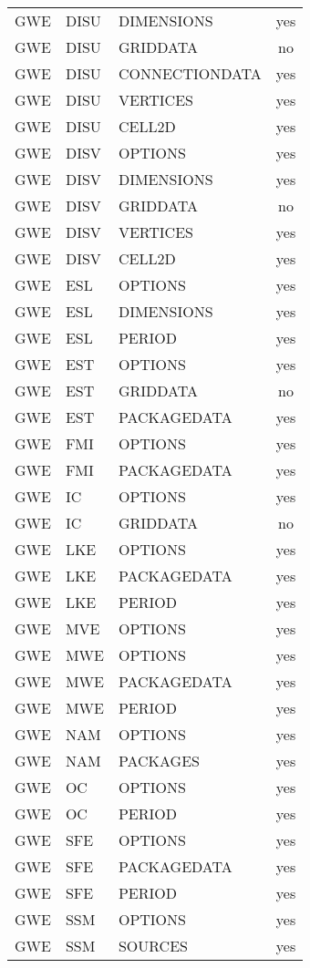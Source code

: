 \begin{longtable}{p{1.5cm} p{1.5cm} p{3cm} c}
GWE & DISU & DIMENSIONS & yes \\ 
GWE & DISU & GRIDDATA & no \\ 
GWE & DISU & CONNECTIONDATA & yes \\ 
GWE & DISU & VERTICES & yes \\ 
GWE & DISU & CELL2D & yes \\ 
\hline
GWE & DISV & OPTIONS & yes \\ 
GWE & DISV & DIMENSIONS & yes \\ 
GWE & DISV & GRIDDATA & no \\ 
GWE & DISV & VERTICES & yes \\ 
GWE & DISV & CELL2D & yes \\ 
\hline
GWE & ESL & OPTIONS & yes \\ 
GWE & ESL & DIMENSIONS & yes \\ 
GWE & ESL & PERIOD & yes \\ 
\hline
GWE & EST & OPTIONS & yes \\ 
GWE & EST & GRIDDATA & no \\ 
GWE & EST & PACKAGEDATA & yes \\ 
\hline
GWE & FMI & OPTIONS & yes \\ 
GWE & FMI & PACKAGEDATA & yes \\ 
\hline
GWE & IC & OPTIONS & yes \\ 
GWE & IC & GRIDDATA & no \\ 
\hline
GWE & LKE & OPTIONS & yes \\ 
GWE & LKE & PACKAGEDATA & yes \\ 
GWE & LKE & PERIOD & yes \\ 
\hline
GWE & MVE & OPTIONS & yes \\ 
\hline
GWE & MWE & OPTIONS & yes \\ 
GWE & MWE & PACKAGEDATA & yes \\ 
GWE & MWE & PERIOD & yes \\ 
\hline
GWE & NAM & OPTIONS & yes \\ 
GWE & NAM & PACKAGES & yes \\ 
\hline
GWE & OC & OPTIONS & yes \\ 
GWE & OC & PERIOD & yes \\ 
\hline
GWE & SFE & OPTIONS & yes \\ 
GWE & SFE & PACKAGEDATA & yes \\ 
GWE & SFE & PERIOD & yes \\ 
\hline
GWE & SSM & OPTIONS & yes \\ 
GWE & SSM & SOURCES & yes \\ 

\end{longtable}
